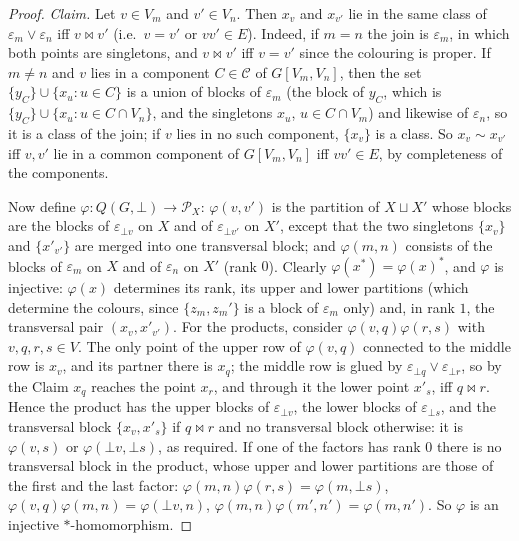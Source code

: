\documentclass[11pt]{amsart}
\theoremstyle{definition}
\renewcommand{\P}{\mathcal{P}}
\newcommand{\mt}{\bowtie}   %
\begin{document}
\begin{proof}
\emph{Claim.} Let $v\in V_m$ and $v'\in V_n$. Then $x_v$ and $x_{v'}$ lie in the same class of $\varepsilon_m\vee\varepsilon_n$ iff $v\mt v'$ (i.e.\ $v=v'$ or $vv'\in E$). Indeed, if $m=n$ the join is $\varepsilon_m$, in which both points are singletons, and $v\mt v'$ iff $v=v'$ since the colouring is proper. If $m\ne n$ and $v$ lies in a component $C\in\mathcal C$ of $G[V_m,V_n]$, then the set $\{y_C\}\cup\{x_u:u\in C\}$ is a union of blocks of $\varepsilon_m$ (the block of $y_C$, which is $\{y_C\}\cup\{x_u:u\in C\cap V_n\}$, and the singletons $x_u$, $u\in C\cap V_m$) and likewise of $\varepsilon_n$, so it is a class of the join; if $v$ lies in no such component, $\{x_v\}$ is a class. So $x_v\sim x_{v'}$ iff $v,v'$ lie in a common component of $G[V_m,V_n]$ iff $vv'\in E$, by completeness of the components.

Now define $\varphi\colon Q(G,\bot)\to\P_X$: $\varphi(v,v')$ is the partition of $X\sqcup X'$ whose blocks are the blocks of $\varepsilon_{\bot v}$ on $X$ and of $\varepsilon_{\bot v'}$ on $X'$, except that the two singletons $\{x_v\}$ and $\{x'_{v'}\}$ are merged into one transversal block; and $\varphi(m,n)$ consists of the blocks of $\varepsilon_m$ on $X$ and of $\varepsilon_n$ on $X'$ (rank $0$). Clearly $\varphi(x^*)=\varphi(x)^*$, and $\varphi$ is injective: $\varphi(x)$ determines its rank, its upper and lower partitions (which determine the colours, since $\{z_m,z_m'\}$ is a block of $\varepsilon_m$ only) and, in rank $1$, the transversal pair $(x_v,x'_{v'})$. For the products, consider $\varphi(v,q)\varphi(r,s)$ with $v,q,r,s\in V$. The only point of the upper row of $\varphi(v,q)$ connected to the middle row is $x_v$, and its partner there is $x_q$; the middle row is glued by $\varepsilon_{\bot q}\vee\varepsilon_{\bot r}$, so by the Claim $x_q$ reaches the point $x_r$, and through it the lower point $x'_s$, iff $q\mt r$. Hence the product has the upper blocks of $\varepsilon_{\bot v}$, the lower blocks of $\varepsilon_{\bot s}$, and the transversal block $\{x_v,x'_s\}$ if $q\mt r$ and no transversal block otherwise: it is $\varphi(v,s)$ or $\varphi(\bot v,\bot s)$, as required. If one of the factors has rank $0$ there is no transversal block in the product, whose upper and lower partitions are those of the first and the last factor: $\varphi(m,n)\varphi(r,s)=\varphi(m,\bot s)$, $\varphi(v,q)\varphi(m,n)=\varphi(\bot v,n)$, $\varphi(m,n)\varphi(m',n')=\varphi(m,n')$. So $\varphi$ is an injective $*$-homomorphism.
\end{proof}
\end{document}
